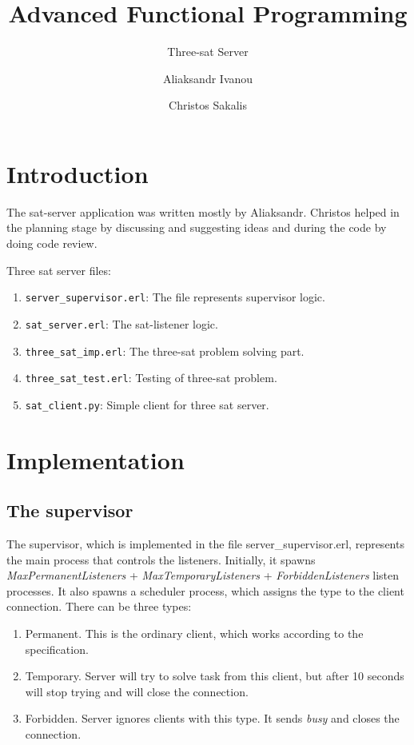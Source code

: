 \documentclass[11pt, a4paper]{scrartcl}
\title{Advanced Functional Programming}
\subtitle{Three-sat Server}
\author{Aliaksandr Ivanou \\ \email{Aliaksandr.Ivanou.1364@student.uu.se}
	\and Christos Sakalis \\ \email{Christos.Sakalis.3822@student.uu.se}}
\newcommand{\cname}[1]{\mbox{\texttt{#1}}}
\begin{document}
\maketitle

\section{Introduction}

The sat-server application was written mostly by Aliaksandr. Christos helped
in the planning stage by discussing and suggesting ideas and during the code by
doing code review.

Three sat server files:

\begin{enumerate}
    \item \cname{server\_supervisor.erl}: The file represents supervisor logic.
    \item \cname{sat\_server.erl}: The sat-listener logic.
    \item \cname{three\_sat\_imp.erl}: The three-sat problem solving part.
    \item \cname{three\_sat\_test.erl}: Testing of three-sat problem.
    \item \cname{sat\_client.py}: Simple client for three sat server.
\end{enumerate}

\section{Implementation}

\subsection{The supervisor}

The supervisor, which is implemented in the file server\_supervisor.erl, represents the main
process that controls the listeners. Initially, it spawns \emph{MaxPermanentListeners} + 
\emph{MaxTemporaryListeners} + \emph{ForbiddenListeners} listen processes. It also spawns
a scheduler process, which assigns the type to the client connection. There can be three types:

\begin{enumerate}
    \item Permanent. This is the ordinary client, which works according to the specification.
    \item Temporary. Server will try to solve task from this client, but after 10 seconds
        will stop trying and will close the connection.
    \item Forbidden. Server ignores clients with this type. It sends \emph{busy} and closes the connection.
\end{enumerate}
\end{document}
